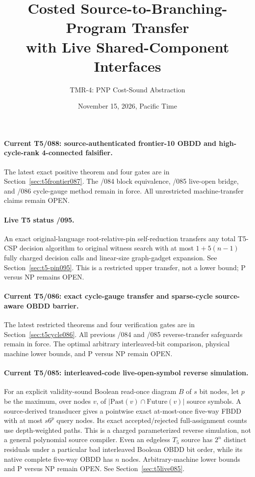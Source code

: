 \documentclass[11pt]{article}
\title{Costed Source-to-Branching-Program Transfer\\with Live Shared-Component Interfaces}
\author{TMR-4: PNP Cost-Sound Abstraction}
\date{November 15, 2026, Pacific Time}
\begin{document}
\paragraph{Current T5/088: source-authenticated frontier-10 OBDD and high-cycle-rank 4-connected falsifier.}
The latest exact positive theorem and four gates are in Section~\ref{sec:t5frontier087}. The /084 block equivalence, /085 live-open bridge, and /086 cycle-gauge method remain in force. All unrestricted machine-transfer claims remain OPEN.
\maketitle
\paragraph{Live T5 status /095.}
An exact original-language root-relative-pin self-reduction
transfers any total T5-CSP decision algorithm to original
witness search with at most $1+5(n-1)$ fully charged
decision calls and linear-size graph-gadget expansion.
See Section~\ref{sec:t5-pin095}. This is a restricted
upper transfer, not a lower bound; P versus NP remains OPEN.

\paragraph{Current T5/086: exact cycle-gauge transfer and sparse-cycle source-aware OBDD barrier.}
The latest restricted theorems and four verification gates are in Section~\ref{sec:t5cycle086}. All previous /084 and /085 reverse-transfer safeguards remain in force. The optimal arbitrary interleaved-bit comparison, physical machine lower bounds, and P versus NP remain OPEN.
\paragraph{Current T5/085: interleaved-code live-open-symbol reverse simulation.}
For an explicit validity-sound Boolean read-once diagram $B$ of
$s$ bit nodes, let $p$ be the maximum, over nodes $v$, of
$|\mathrm{Past}(v)\cap\mathrm{Future}(v)|$ source symbols.
A source-derived transducer gives a pointwise exact at-most-once five-way
FBDD with at most $s6^p$ query nodes. Its exact accepted/rejected
full-assignment counts use depth-weighted paths. This is a charged
parameterized reverse simulation, not a general polynomial source compiler.
Even an edgeless $T_5$ source has $2^n$ distinct residuals under a
particular bad interleaved Boolean OBDD bit order, while its native
complete five-way OBDD has $n$ nodes. Arbitrary-machine lower bounds
and P versus NP remain OPEN. See Section~\ref{sec:t5live085}.
\end{document}
